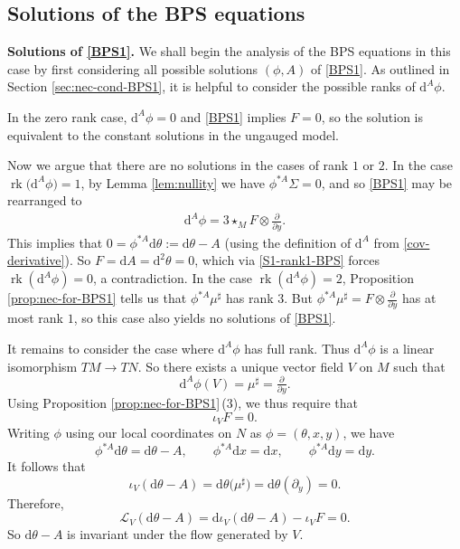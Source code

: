 \documentclass[10pt,a4paper]{amsart}
\newcommand{\1}{{\mathbb{1}}}
\newcommand{\bdy}{\partial}
\def \d{\mathrm{d}}
\newcommand{\rk}{{\operatorname{rk}}}
\numberwithin{equation}{section}
\begin{document}
\subsection{Solutions of the BPS equations}

{\bf Solutions of \eqref{BPS1}.} We shall begin the analysis of the BPS equations in this case by first considering all possible solutions $(\phi,A)$ of \eqref{BPS1}. As outlined in Section \ref{sec:nec-cond-BPS1}, it is helpful to consider the possible ranks of $\d^A\phi$.

In the zero rank case, $\d^A\phi=0$ and \eqref{BPS1} implies $F=0$, so the solution is equivalent to the constant solutions in the ungauged model.

Now we argue that there are no solutions in the cases of rank $1$ or $2$. In the case $\rk\big(\d^A\phi\big)=1$, by Lemma \ref{lem:nullity} we have $\phi^{\ast A}\Sigma=0$, and so \eqref{BPS1} may be rearranged to
\begin{align}
\label{S1-rank1-BPS}
 \d^A\phi=3\star_{M}F\otimes\frac{\bdy}{\bdy y}.
\end{align}
This implies that $0=\phi^{\ast A}\d\theta:=\d\theta - A$ (using the definition of $\d^A$ from \eqref{cov-derivative}). So $F=\d A=\d^2\theta=0$, which via \eqref{S1-rank1-BPS} forces $\rk(\d^A\phi)=0$, a contradiction. In the case $\rk(\d^A\phi)=2$, Proposition \ref{prop:nec-for-BPS1} tells us that $\phi^{\ast A}\mu^\sharp$ has rank $3$. But $\phi^{\ast A}\mu^\sharp=F\otimes\tfrac{\bdy}{\bdy y}$ has at most rank $1$, so this case also yields no solutions of \eqref{BPS1}.

It remains to consider the case where $\d^A\phi$ has full rank. Thus $\d^A\phi$ is a linear isomorphism $TM\to TN$. So there exists a unique vector field $V$ on $M$ such that
\begin{equation*}
\d^A\phi(V)=\mu^\sharp=\tfrac{\partial}{\partial y}.
\end{equation*}
Using Proposition \ref{prop:nec-for-BPS1}\,(3), we thus require that
\begin{equation*}
\iota_V F = 0.
\end{equation*}
Writing $\phi$ using our local coordinates on $N$ as $\phi=(\theta,x,y)$, we have
\begin{equation*}
\phi^{\ast A}\d\theta = \d\theta-A,\qquad\phi^{\ast A}\d x = \d x,\qquad\phi^{\ast A}\d y = \d y.
\end{equation*}
It follows that
\begin{equation*}
\iota_V (\d\theta-A) = \d\theta\big(\mu^\sharp\big) = \d\theta(\partial_y)=0.
\end{equation*}
Therefore,
\begin{equation*}
\mathcal{L}_V(\d\theta-A) = \d\iota_V(\d\theta-A) -\iota_V F = 0.
\end{equation*}
So $\d\theta-A$ is invariant under the flow generated by $V$.
\end{document}
